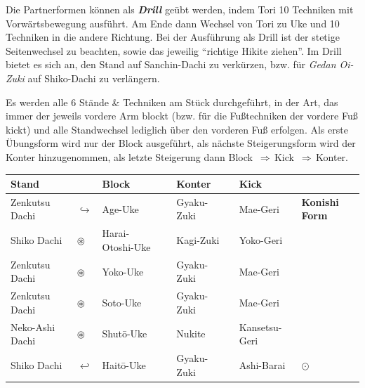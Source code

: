 \documentclass[a5paper,landscape,DIV=calc,11pt,notitlepage]{scrartcl}
\begin{document}
\begin{tcolorbox}[colback=white,colframe=GKD,coltitle=white,adjusted title=Kihon-Ippon-Kumite]
\begin{minipage}[t]{\textwidth}
{		}%
		{\footnotesize 
			Die Partnerformen können als \textbf{\textit{Drill}} geübt werden, indem Tori 10 Techniken mit Vorwärtsbewegung ausführt. Am Ende dann Wechsel von Tori zu Uke und 10 Techniken in die andere Richtung. Bei der Ausführung als Drill ist der stetige Seitenwechsel zu beachten, sowie das jeweilig \textquotedblleft richtige Hikite ziehen\textquotedblright. Im Drill bietet es sich an, den Stand auf Sanchin-Dachi zu verkürzen, bzw. für \textit{Gedan Oi-Zuki} auf Shiko-Dachi zu verlängern.
		}
	\end{minipage}
	\null\vfill\null	
\end{tcolorbox}
\pagebreak
\begin{tcolorbox}[colback=white,colframe=GKD,coltitle=white,adjusted title=B\={o}gy\={o} R\={o}k\={u} Kyod\={o} aus dem Japan Karate-D\={o} Jinen-Kai]
	\null\vfill\null
	\begin{center}
		\parbox{\textwidth-2\tabcolsep}{Es werden alle 6 Stände \& Techniken am Stück durchgeführt, in der Art, das immer der jeweils vordere Arm blockt (bzw. für die Fußtechniken der vordere Fuß kickt) und alle Standwechsel lediglich über den vorderen Fuß erfolgen. Als erste Übungsform wird nur der Block ausgeführt, als nächste Steigerungsform wird der Konter hinzugenommen, als letzte Steigerung dann \mbox{Block \(\Rightarrow\)\,Kick \(\Rightarrow\)\,Konter.}}
	\end{center}
	\begin{tabularx}{\textwidth}{lllXlXll}
		Stand	&&Block	&&Konter	&&Kick&\\
		\midrule
		Zenkutsu Dachi 	& \(\hookrightarrow\) & Age-Uke	&&Gyaku-Zuki	&&Mae-Geri&\textbf{Konishi Form}\\
		Shiko Dachi 	& \(\circledast\) & Harai-Otoshi-Uke	&&Kagi-Zuki&&Yoko-Geri&\\
		Zenkutsu Dachi	& \(\circledast\) & Yoko-Uke	&&Gyaku-Zuki&&Mae-Geri&\\
		Zenkutsu Dachi	& \(\circledast\) & Soto-Uke	&&Gyaku-Zuki&&Mae-Geri&\\
		Neko-Ashi Dachi	& \(\circledast\) & Shut\={o}-Uke	&&Nukite&&Kansetsu-Geri&\\
		Shiko Dachi	& \(\hookleftarrow\) & Hait\={o}-Uke	&&Gyaku-Zuki&&Ashi-Barai& \(\odot\)\\
		\midrule
	\end{tabularx}\\\null\vfill\null
\end{tcolorbox}
\end{document}

